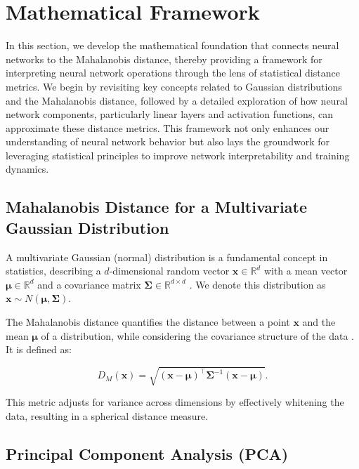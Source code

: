 
\section{Mathematical Framework}
\label{sec:math_framework}

In this section, we develop the mathematical foundation that connects neural networks to the Mahalanobis distance, thereby providing a framework for interpreting neural network operations through the lens of statistical distance metrics. We begin by revisiting key concepts related to Gaussian distributions and the Mahalanobis distance, followed by a detailed exploration of how neural network components, particularly linear layers and activation functions, can approximate these distance metrics. This framework not only enhances our understanding of neural network behavior but also lays the groundwork for leveraging statistical principles to improve network interpretability and training dynamics.

\subsection{Mahalanobis Distance for a Multivariate Gaussian Distribution}

A multivariate Gaussian (normal) distribution is a fundamental concept in statistics, describing a \(d\)-dimensional random vector \(\mathbf{x} \in \mathbb{R}^d\) with a mean vector \(\boldsymbol{\mu} \in \mathbb{R}^d\) and a covariance matrix \(\boldsymbol{\Sigma} \in \mathbb{R}^{d \times d}\) \citep{bishop2006pattern}. We denote this distribution as \(\mathbf{x} \sim N(\boldsymbol{\mu}, \boldsymbol{\Sigma})\).

The Mahalanobis distance quantifies the distance between a point \(\mathbf{x}\) and the mean \(\boldsymbol{\mu}\) of a distribution, while considering the covariance structure of the data \citep{mahalanobis1936generalized, demaesschalck2000mahalanobis}. It is defined as:

\begin{equation}
\label{eq:mahalanobis_distance}
D_M(\mathbf{x}) = \sqrt{ (\mathbf{x} - \boldsymbol{\mu})^\top \boldsymbol{\Sigma}^{-1} (\mathbf{x} - \boldsymbol{\mu}) }.
\end{equation}

This metric adjusts for variance across dimensions by effectively whitening the data, resulting in a spherical distance measure.

\subsection{Principal Component Analysis (PCA)}

